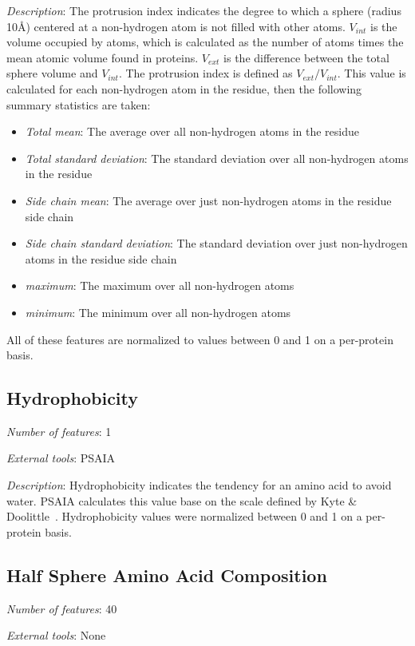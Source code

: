 \noindent
\emph{Description}:
The protrusion index indicates the degree to which a sphere (radius 10\AA{}) centered at a non-hydrogen atom is not filled with other atoms.
$V_{int}$ is the volume occupied by atoms, which is calculated as the number of atoms times the mean atomic volume found in proteins.
$V_{ext}$ is the difference between the total sphere volume and $V_{int}$. 
The protrusion index is defined as $V_{ext}/V_{int}$.
This value is calculated for each non-hydrogen atom in the residue, then the following summary statistics are taken:
\begin{itemize}
	\item \emph{Total mean}: The average over all non-hydrogen atoms in the residue
	\item \emph{Total standard deviation}: The standard deviation over all non-hydrogen atoms in the residue
	\item \emph{Side chain mean}: The average over just non-hydrogen atoms in the residue side chain
	\item \emph{Side chain standard deviation}: The standard deviation over just non-hydrogen atoms in the residue side chain
	\item \emph{maximum}: The maximum over all non-hydrogen atoms
	\item \emph{minimum}: The minimum over all non-hydrogen atoms
\end{itemize}
All of these features are normalized to values between 0 and 1 on a per-protein basis.


\subsection{Hydrophobicity}
\noindent
\emph{Number of features}: 1

\noindent
\emph{External tools}: PSAIA~\cite{mihel2008}

\noindent
\emph{Description}:
Hydrophobicity indicates the tendency for an amino acid to avoid water.
PSAIA calculates this value base on the scale defined by Kyte \& Doolittle~\cite{kyte1982}.
Hydrophobicity values were normalized between 0 and 1 on a per-protein basis.


\subsection{Half Sphere Amino Acid Composition}
\noindent
\emph{Number of features}: 40

\noindent
\emph{External tools}:  None

